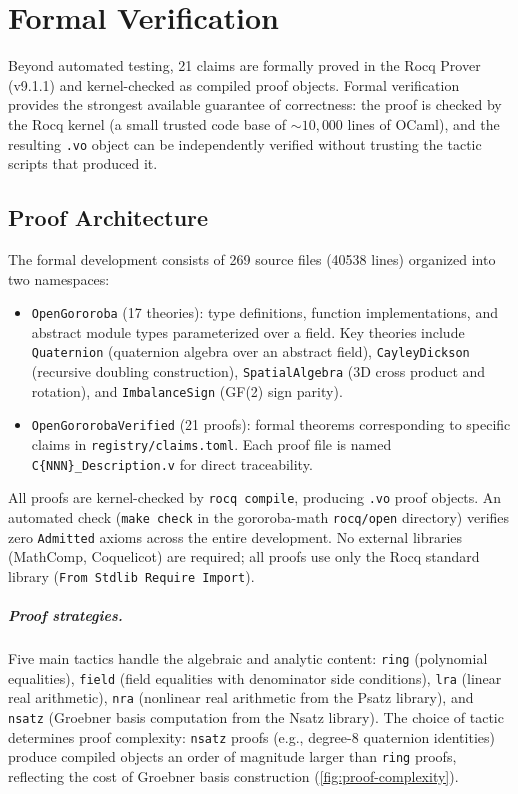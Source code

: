 \documentclass[12pt,openany]{report}
\theoremstyle{definition}
\theoremstyle{plain}
\theoremstyle{remark}
\newcommand{\prooffilecount}{269}
\newcommand{\prooflinecount}{40538}
\newcommand{\kernelchecked}{21}
\begin{document}
\chapter{Formal Verification}
\label{ch:formal}

Beyond automated testing, \kernelchecked{} claims are formally proved in the
Rocq Prover (v9.1.1) and kernel-checked as compiled proof objects.
Formal verification provides the strongest available guarantee of
correctness: the proof is checked by the Rocq kernel (a small trusted
code base of ${\sim}10{,}000$ lines of OCaml), and the resulting
\texttt{.vo} object can be independently verified without trusting the
tactic scripts that produced it.

\section{Proof Architecture}

The formal development consists of \prooffilecount{} source files
(\prooflinecount{} lines) organized into two namespaces:
\begin{itemize}
  \item \texttt{OpenGororoba} (17 theories): type definitions, function
    implementations, and abstract module types parameterized over a field.
    Key theories include \texttt{Quaternion} (quaternion algebra over an
    abstract field), \texttt{CayleyDickson} (recursive doubling
    construction), \texttt{SpatialAlgebra} (3D cross product and rotation),
    and \texttt{ImbalanceSign} (GF(2) sign parity).
  \item \texttt{OpenGororobaVerified} (21 proofs): formal theorems
    corresponding to specific claims in \texttt{registry/claims.toml}.
    Each proof file is named \texttt{C\{NNN\}\_Description.v} for
    direct traceability.
\end{itemize}

All proofs are kernel-checked by \texttt{rocq compile}, producing
\texttt{.vo} proof objects.  An automated check (\texttt{make check} in the gororoba-math
\texttt{rocq/open} directory) verifies zero \texttt{Admitted} axioms across the entire
development.  No external libraries (MathComp, Coquelicot) are
required; all proofs use only the Rocq standard library
(\texttt{From Stdlib Require Import}).

\paragraph{Proof strategies.}
Five main tactics handle the algebraic and analytic content:
\texttt{ring} (polynomial equalities), \texttt{field} (field equalities
with denominator side conditions), \texttt{lra} (linear real
arithmetic), \texttt{nra} (nonlinear real arithmetic from the Psatz
library), and \texttt{nsatz} (Groebner basis computation from the Nsatz
library).  The choice of tactic determines proof complexity:
\texttt{nsatz} proofs (e.g., degree-8 quaternion identities) produce
compiled objects an order of magnitude larger than \texttt{ring} proofs,
reflecting the cost of Groebner basis construction
(\cref{fig:proof-complexity}).
\end{document}
